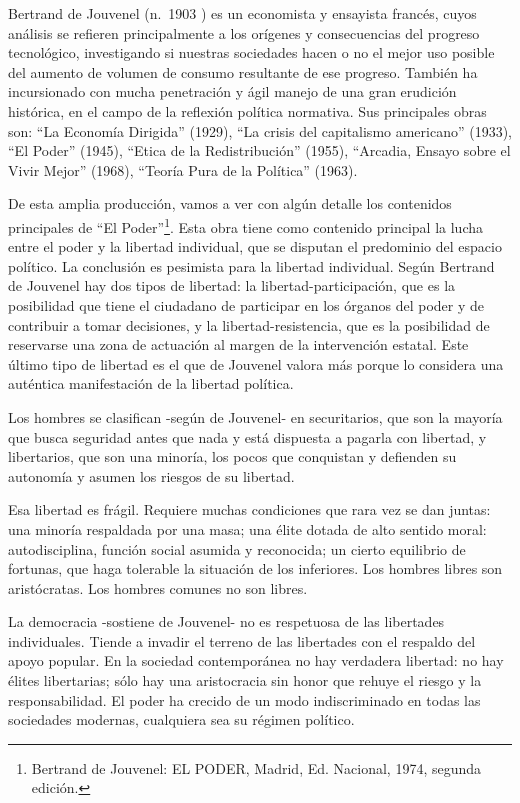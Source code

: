 \documentclass[
]{book}
\begin{document}
Bertrand de Jouvenel (n.~1903 ) es un economista y ensayista francés, cuyos análisis se refieren principalmente a los orígenes y consecuencias del progreso tecnológico, investigando si nuestras sociedades hacen o no el mejor uso posible del aumento de volumen de consumo resultante de ese progreso. También ha incursionado con mucha penetración y ágil manejo de una gran erudición histórica, en el campo de la reflexión política normativa. Sus principales obras son: ``La Economía Dirigida'' (1929), ``La crisis del capitalismo americano'' (1933), ``El Poder'' (1945), ``Etica de la Redistribución'' (1955), ``Arcadia, Ensayo sobre el Vivir Mejor'' (1968), ``Teoría Pura de la Política'' (1963).

De esta amplia producción, vamos a ver con algún detalle los contenidos principales de ``El Poder''\footnote{Bertrand de Jouvenel: EL PODER, Madrid, Ed. Nacional, 1974, segunda edición.}. Esta obra tiene como contenido principal la lucha entre el poder y la libertad individual, que se disputan el predominio del espacio político. La conclusión es pesimista para la libertad individual. Según Bertrand de Jouvenel hay dos tipos de libertad: la libertad-participación, que es la posibilidad que tiene el ciudadano de participar en los órganos del poder y de contribuir a tomar decisiones, y la libertad-resistencia, que es la posibilidad de reservarse una zona de actuación al margen de la intervención estatal. Este último tipo de libertad es el que de Jouvenel valora más porque lo considera una auténtica manifestación de la libertad política.

Los hombres se clasifican -según de Jouvenel- en securitarios, que son la mayoría que busca seguridad antes que nada y está dispuesta a pagarla con libertad, y libertarios, que son una minoría, los pocos que conquistan y defienden su autonomía y asumen los riesgos de su libertad.

Esa libertad es frágil. Requiere muchas condiciones que rara vez se dan juntas: una minoría respaldada por una masa; una élite dotada de alto sentido moral: autodisciplina, función social asumida y reconocida; un cierto equilibrio de fortunas, que haga tolerable la situación de los inferiores. Los hombres libres son aristócratas. Los hombres comunes no son libres.

La democracia -sostiene de Jouvenel- no es respetuosa de las libertades individuales. Tiende a invadir el terreno de las libertades con el respaldo del apoyo popular. En la sociedad contemporánea no hay verdadera libertad: no hay élites libertarias; sólo hay una aristocracia sin honor que rehuye el riesgo y la responsabilidad. El poder ha crecido de un modo indiscriminado en todas las sociedades modernas, cualquiera sea su régimen político.
\end{document}
